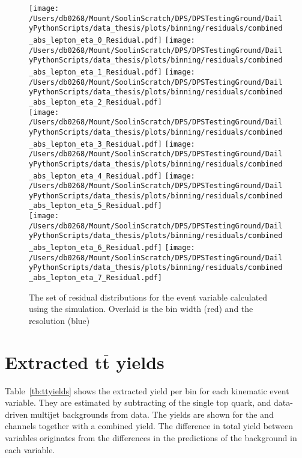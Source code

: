\begin{figure}[htpb]
	\centering
	\texttt{[image: /Users/db0268/Mount/SoolinScratch/DPS/DPSTestingGround/DailyPythonScripts/data\_thesis/plots/binning/residuals/combined\_abs\_lepton\_eta\_0\_Residual.pdf]}
	\texttt{[image: /Users/db0268/Mount/SoolinScratch/DPS/DPSTestingGround/DailyPythonScripts/data\_thesis/plots/binning/residuals/combined\_abs\_lepton\_eta\_1\_Residual.pdf]}
	\texttt{[image: /Users/db0268/Mount/SoolinScratch/DPS/DPSTestingGround/DailyPythonScripts/data\_thesis/plots/binning/residuals/combined\_abs\_lepton\_eta\_2\_Residual.pdf]} \\
	\texttt{[image: /Users/db0268/Mount/SoolinScratch/DPS/DPSTestingGround/DailyPythonScripts/data\_thesis/plots/binning/residuals/combined\_abs\_lepton\_eta\_3\_Residual.pdf]} 
	\texttt{[image: /Users/db0268/Mount/SoolinScratch/DPS/DPSTestingGround/DailyPythonScripts/data\_thesis/plots/binning/residuals/combined\_abs\_lepton\_eta\_4\_Residual.pdf]} 
	\texttt{[image: /Users/db0268/Mount/SoolinScratch/DPS/DPSTestingGround/DailyPythonScripts/data\_thesis/plots/binning/residuals/combined\_abs\_lepton\_eta\_5\_Residual.pdf]} \\
	\texttt{[image: /Users/db0268/Mount/SoolinScratch/DPS/DPSTestingGround/DailyPythonScripts/data\_thesis/plots/binning/residuals/combined\_abs\_lepton\_eta\_6\_Residual.pdf]}
	\texttt{[image: /Users/db0268/Mount/SoolinScratch/DPS/DPSTestingGround/DailyPythonScripts/data\_thesis/plots/binning/residuals/combined\_abs\_lepton\_eta\_7\_Residual.pdf]} \\
	\caption[The set of residual distributions for the \LETA{} event variable calculated using the \powhegpythia{} simulation. Overlaid is the bin width (red) and the resolution (blue)]{The set of residual distributions for the \LETA{} event variable calculated using the \powhegpythia{} simulation. Overlaid is the bin width (red) and the resolution (blue)}
	\label{fig:ResLETA}
\end{figure}



\chapter{Extracted $\mathbf{t\overline{t}}$ yields} %
\label{ch:extracted_ttbar}
Table~\ref{tb:ttyields} shows the extracted \ttbar{} yield per bin for each kinematic event variable.
They are estimated by subtracting of the single top quark, \Vjets{} and data-driven multijet \QCD{} backgrounds from data.
The yields are shown for the \eJets{} and \muJets{} channels together with a combined yield.
The difference in total \ttbar{} yield between variables originates from the differences in the predictions of the \QCD{} background in each variable.


